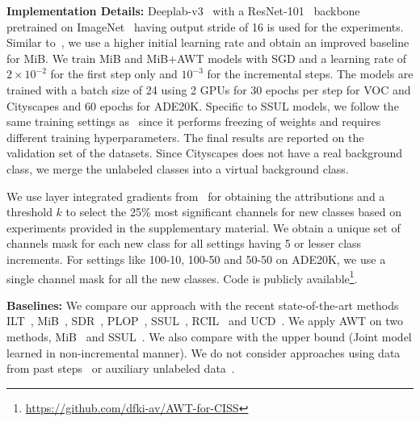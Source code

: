 \noindent\textbf{Implementation Details:}
Deeplab-v3~\cite{chen2017rethinking} with a ResNet-101~\cite{he2016deep} backbone pretrained on ImageNet~\cite{deng2009imagenet} having output stride of 16 is used for the experiments. Similar to~\cite{zhang2022representation}, we use a higher initial learning rate and obtain an improved baseline for MiB. We train MiB and MiB+AWT models with SGD and a learning rate of $2 \times 10^{-2}$ for the first step only and $10^{-3}$ for the incremental steps. The models are trained with a batch size of 24 using 2 GPUs for 30 epochs per step for VOC and Cityscapes and 60 epochs for ADE20K. Specific to SSUL models, we follow the same training settings as~\cite{cha2021ssul} since it performs freezing of weights and requires different training hyperparameters. The final results are reported on the validation set of the datasets. Since Cityscapes does not have a real background class, we merge the unlabeled classes into a virtual background class.

We use layer integrated gradients from~\cite{kokhlikyan2020captum} for obtaining the attributions and a threshold $k$ to select the 25\% most significant channels for new classes based on experiments provided in the supplementary material. We obtain a unique set of channels mask for each new class for all settings having 5 or lesser class increments. For settings like 100-10, 100-50 and 50-50 on ADE20K, we use a single channel mask for all the new classes. Code is publicly available\footnote{\url{https://github.com/dfki-av/AWT-for-CISS}}.


\noindent\textbf{Baselines:} We compare our approach with the recent state-of-the-art methods ILT~\cite{michieli2019incremental}, MiB~\cite{cermelli2020modeling}, SDR~\cite{michieli2021continual}, PLOP~\cite{douillard2021plop}, SSUL~\cite{cha2021ssul}, RCIL~\cite{zhang2022representation} and UCD~\cite{yang2022uncertainty}. We apply AWT on two methods, MiB~\cite{cermelli2020modeling} and SSUL~\cite{cha2021ssul}.
We also compare with the upper bound (Joint model learned in non-incremental manner). We do not consider approaches using data from past steps~\cite{maracani2021recall} or auxiliary unlabeled data~\cite{yu2022self}.



